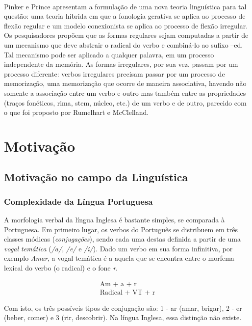 \\
Pinker e Prince \citeyear{Pinker:1988} apresentam a formulação de uma nova teoria linguística para tal questão: uma teoria híbrida em que a fonologia gerativa se aplica ao processo de flexão regular e um modelo conexionista se aplica ao processo de flexão irregular. Os pesquisadores propõem que as formas regulares sejam computadas a partir de um mecanismo que deve abstrair o radical do verbo e combiná-lo ao sufixo –ed.  Tal mecanismo pode ser aplicado a qualquer palavra, em um processo independente da memória. As formas irregulares, por sua vez, passam por um processo diferente: verbos irregulares precisam passar por um processo de memorização, uma memorização que ocorre de maneira associativa, havendo não somente a associação entre um verbo e outro mas também entre as propriedades (traços fonéticos, rima, stem, núcleo, etc.) de um verbo e de outro, parecido com o que foi proposto por Rumelhart e McClelland.

\section{Motivação}
\label{sec:motivation}

\subsection{Motivação no campo da Linguística}

\subsubsection{Complexidade da Língua Portuguesa}

A morfologia verbal da língua Inglesa é bastante simples, se comparada à Portuguesa. Em primeiro lugar, os verbos do Português se distribuem em três classes módicas (\textit{conjugações}), sendo cada uma destas definida a partir de uma \textit{vogal temática} (\textit{/a/}, \textit{/e/} e \textit{/i/}). Dado um verbo em sua forma infinitiva, por exemplo \textit{Amar}, a vogal temática é a aquela que se encontra entre o morfema lexical do verbo (o radical) e o fone \textit{r}.

\begin{align*}
    \text{Am + a + r}\\
    \text{Radical + VT + r} 
\end{align*}

Com isto, os três possíveis tipos de conjugação são: 1 - ar (amar, brigar), 2 - er (beber, comer) e 3 (rir, descobrir). Na língua Inglesa, essa distinção não existe. 

